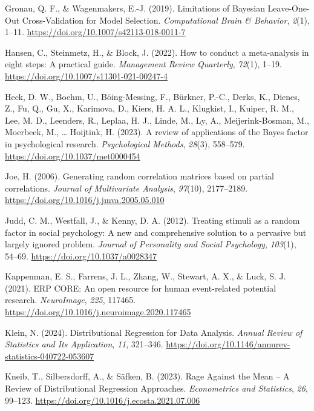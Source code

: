 \documentclass[
  doc,12pt,floatsintext]{apa7}
\newlength{\cslhangindent}
\newenvironment{CSLReferences}[2] %
 {\begin{list}{}{%
  \setlength{\itemindent}{0pt}
  \setlength{\leftmargin}{0pt}
  \setlength{\parsep}{0pt}
  \ifodd #1
   \setlength{\leftmargin}{\cslhangindent}
   \setlength{\itemindent}{-1\cslhangindent}
  \fi
  \setlength{\itemsep}{#2\baselineskip}}}
 {\end{list}}
\begin{document}
\begin{CSLReferences}{1}{0}
Gronau, Q. F., \& Wagenmakers, E.-J. (2019). Limitations of {Bayesian Leave-One-Out Cross-Validation} for {Model Selection}. \emph{Computational Brain \& Behavior}, \emph{2}(1), 1--11. \url{https://doi.org/10.1007/s42113-018-0011-7}

Hansen, C., Steinmetz, H., \& Block, J. (2022). How to conduct a meta-analysis in eight steps: A practical guide. \emph{Management Review Quarterly}, \emph{72}(1), 1--19. \url{https://doi.org/10.1007/s11301-021-00247-4}

Heck, D. W., Boehm, U., Böing-Messing, F., Bürkner, P.-C., Derks, K., Dienes, Z., Fu, Q., Gu, X., Karimova, D., Kiers, H. A. L., Klugkist, I., Kuiper, R. M., Lee, M. D., Leenders, R., Leplaa, H. J., Linde, M., Ly, A., Meijerink-Bosman, M., Moerbeek, M., \ldots{} Hoijtink, H. (2023). A review of applications of the {Bayes} factor in psychological research. \emph{Psychological Methods}, \emph{28}(3), 558--579. \url{https://doi.org/10.1037/met0000454}

Joe, H. (2006). Generating random correlation matrices based on partial correlations. \emph{Journal of Multivariate Analysis}, \emph{97}(10), 2177--2189. \url{https://doi.org/10.1016/j.jmva.2005.05.010}

Judd, C. M., Westfall, J., \& Kenny, D. A. (2012). Treating stimuli as a random factor in social psychology: A new and comprehensive solution to a pervasive but largely ignored problem. \emph{Journal of Personality and Social Psychology}, \emph{103}(1), 54--69. \url{https://doi.org/10.1037/a0028347}

Kappenman, E. S., Farrens, J. L., Zhang, W., Stewart, A. X., \& Luck, S. J. (2021). {ERP CORE}: {An} open resource for human event-related potential research. \emph{NeuroImage}, \emph{225}, 117465. \url{https://doi.org/10.1016/j.neuroimage.2020.117465}

Klein, N. (2024). Distributional {Regression} for {Data Analysis}. \emph{Annual Review of Statistics and Its Application}, \emph{11}, 321--346. \url{https://doi.org/10.1146/annurev-statistics-040722-053607}

Kneib, T., Silbersdorff, A., \& Säfken, B. (2023). Rage {Against} the {Mean} -- {A Review} of {Distributional Regression Approaches}. \emph{Econometrics and Statistics}, \emph{26}, 99--123. \url{https://doi.org/10.1016/j.ecosta.2021.07.006}


\end{CSLReferences}
\end{document}
